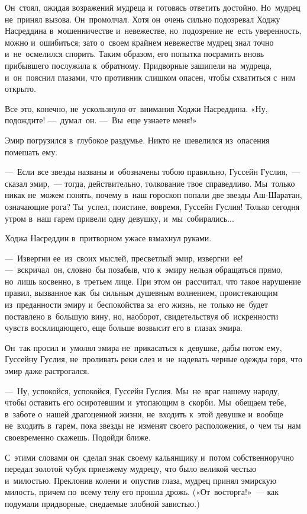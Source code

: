 \documentclass[12pt,a4paper]{book}
\begin{document}
Он~стоял, ожидая возражений мудреца и~готовясь ответить достойно. Но~мудрец не~принял вызова. Он~промолчал. Хотя он~очень сильно подозревал Ходжу Насреддина в~мошенничестве и~невежестве, но~подозрение не~есть уверенность, можно и~ошибиться; зато о~своем крайнем невежестве мудрец знал точно и~не~осмелился спорить. Таким образом, его попытка посрамить вновь прибывшего послужила к~обратному. Придворные зашипели на~мудреца, и~он~пояснил глазами, что противник слишком опасен, чтобы схватиться с~ним открыто.

Все это, конечно, не~ускользнуло от~внимания Ходжи Насреддина. «Ну, подождите! —~думал~он. —~Вы~еще узнаете меня!»

Эмир погрузился в~глубокое раздумье. Никто не~шевелился из~опасения помешать ему.

—~Если все звезды названы и~обозначены тобою правильно, Гуссейн Гуслия,~— сказал эмир,~— тогда, действительно, толкование твое справедливо. Мы~только никак не~можем понять, почему в~наш гороскоп попали две звезды Аш-Шаратан, означающие рога? Ты~успел, поистине, вовремя, Гуссейн Гуслия! Только сегодня утром в~наш гарем привели одну девушку, и~мы~собирались...

Ходжа Насреддин в~притворном ужасе взмахнул руками.

—~Извергни ее~из~своих мыслей, пресветлый эмир, извергни~ее! —~вскричал~он, словно~бы позабыв, что к~эмиру нельзя обращаться прямо, но~лишь косвенно, в~третьем лице. При этом он~рассчитал, что такое нарушение правил, вызванное как~бы сильным душевным волнением, проистекающим из~преданности эмиру и~беспокойства за~его жизнь, не~только не~будет поставлено в~большую вину, но, наоборот, свидетельствуя об~искренности чувств восклицающего, еще больше возвысит его в~глазах эмира.

Он~так просил и~умолял эмира не~прикасаться к~девушке, дабы потом ему, Гуссейну Гуслия, не~проливать реки слез и~не~надевать черные одежды горя, что эмир даже растрогался.

—~Ну, успокойся, успокойся, Гуссейн Гуслия. Мы~не~враг нашему народу, чтобы оставить его осиротевшим и~утопающим в~скорби. Мы~обещаем тебе, в~заботе о~нашей драгоценной жизни, не~входить к~этой девушке и~вообще не~входить в~гарем, пока звезды не~изменят своего расположения, о~чем ты~нам своевременно скажешь. Подойди ближе.

С~этими словами он~сделал знак своему кальянщику и~потом собственноручно передал золотой чубук приезжему мудрецу, что было великой честью и~милостью. Преклонив колени и~опустив глаза, мудрец принял эмирскую милость, причем по~всему телу его прошла дрожь. («От~восторга!»~— как подумали придворные, снедаемые злобной завистью.)
\end{document}
